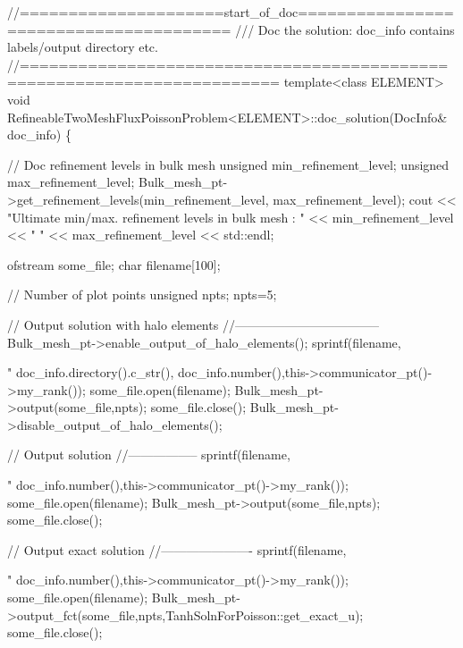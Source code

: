 \begin{DoxyCodeInclude}
\textcolor{comment}{//=====================start\_of\_doc=======================================}
\textcolor{comment}{/// Doc the solution: doc\_info contains labels/output directory etc.}
\textcolor{comment}{}\textcolor{comment}{//========================================================================}
\textcolor{keyword}{template}<\textcolor{keyword}{class} ELEMENT>
\textcolor{keywordtype}{void} RefineableTwoMeshFluxPoissonProblem<ELEMENT>::doc\_solution(DocInfo& doc\_info)
\{ 

 \textcolor{comment}{// Doc refinement levels in bulk mesh}
 \textcolor{keywordtype}{unsigned} min\_refinement\_level;
 \textcolor{keywordtype}{unsigned} max\_refinement\_level;
 Bulk\_mesh\_pt->get\_refinement\_levels(min\_refinement\_level,
                                     max\_refinement\_level); 
 cout << \textcolor{stringliteral}{"Ultimate min/max. refinement levels in bulk mesh : "} 
      << min\_refinement\_level << \textcolor{stringliteral}{" "} 
      << max\_refinement\_level << std::endl;


 ofstream some\_file;
 \textcolor{keywordtype}{char} filename[100];

 \textcolor{comment}{// Number of plot points}
 \textcolor{keywordtype}{unsigned} npts;
 npts=5; 


 \textcolor{comment}{// Output solution with halo elements }
 \textcolor{comment}{//-----------------------------------}
 Bulk\_mesh\_pt->enable\_output\_of\_halo\_elements();
 sprintf(filename,\textcolor{stringliteral}{"%
         doc\_info.directory().c\_str(),
         doc\_info.number(),this->communicator\_pt()->my\_rank());
 some\_file.open(filename);
 Bulk\_mesh\_pt->output(some\_file,npts);
 some\_file.close();
 Bulk\_mesh\_pt->disable\_output\_of\_halo\_elements();


 \textcolor{comment}{// Output solution }
 \textcolor{comment}{//-----------------}
 sprintf(filename,\textcolor{stringliteral}{"%
         doc\_info.number(),this->communicator\_pt()->my\_rank());
 some\_file.open(filename);
 Bulk\_mesh\_pt->output(some\_file,npts);
 some\_file.close();

 \textcolor{comment}{// Output exact solution }
 \textcolor{comment}{//----------------------}
 sprintf(filename,\textcolor{stringliteral}{"%
         doc\_info.number(),this->communicator\_pt()->my\_rank());
 some\_file.open(filename);
 Bulk\_mesh\_pt->output\_fct(some\_file,npts,TanhSolnForPoisson::get\_exact\_u); 
 some\_file.close();


}}}
\end{DoxyCodeInclude}
